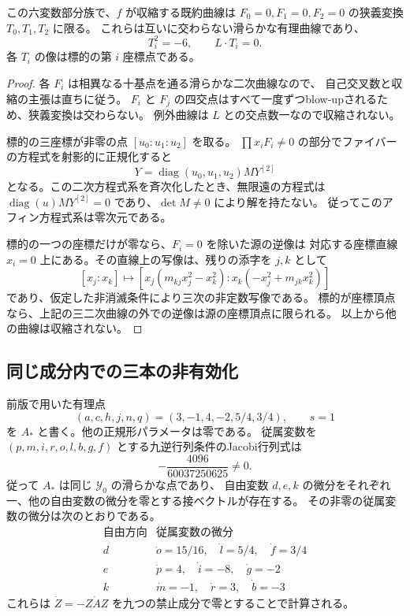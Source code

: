 \begin{lemma}[三本の $(-6)$ 曲線]
\label{lem:septic-three-conics-v30}
この六変数部分族で、$f$ が収縮する既約曲線は
$F_0=0,F_1=0,F_2=0$ の狭義変換 $T_0,T_1,T_2$ に限る。
これらは互いに交わらない滑らかな有理曲線であり、
\[
 T_i^2=-6,\qquad L\cdot T_i=0.
\]
各 $T_i$ の像は標的の第 $i$ 座標点である。
\end{lemma}
\begin{proof}
各 $F_i$ は相異なる十基点を通る滑らかな二次曲線なので、
自己交叉数と収縮の主張は直ちに従う。
$F_i$ と $F_j$ の四交点はすべて一度ずつblow-upされるため、狭義変換は交わらない。
例外曲線は $L$ との交点数一なので収縮されない。

標的の三座標が非零の点 $[u_0:u_1:u_2]$ を取る。
$\prod x_iF_i\ne0$ の部分でファイバーの方程式を射影的に正規化すると
\[
 Y=\operatorname{diag}(u_0,u_1,u_2)M Y^{[2]}
\]
となる。この二次方程式系を斉次化したとき、無限遠の方程式は
$\operatorname{diag}(u)M Y^{[2]}=0$ であり、$\det M\ne0$ により解を持たない。
従ってこのアフィン方程式系は零次元である。

標的の一つの座標だけが零なら、$F_i=0$ を除いた源の逆像は
対応する座標直線 $x_i=0$ 上にある。その直線上の写像は、残りの添字を $j,k$ として
\[
 [x_j:x_k]\longmapsto
 [x_j(m_{kj}x_j^2-x_k^2):x_k(-x_j^2+m_{jk}x_k^2)]
\]
であり、仮定した非消滅条件により三次の非定数写像である。
標的が座標頂点なら、上記の三二次曲線の外での逆像は源の座標頂点に限られる。
以上から他の曲線は収縮されない。
\end{proof}

\subsection{同じ成分内での三本の非有効化}

前版で用いた有理点
\[
 (a,c,h,j,n,q)=(3,-1,4,-2,5/4,3/4),\qquad s=1
\]
を $A_*$ と書く。他の正規形パラメータは零である。
従属変数を $(p,m,i,r,o,l,b,g,f)$ とする九逆行列条件のJacobi行列式は
\[
 -\frac{4096}{60037250625}\ne0.
\]
従って $A_*$ は同じ $\mathcal Y_0$ の滑らかな点であり、
自由変数 $d,e,k$ の微分をそれぞれ一、他の自由変数の微分を零とする接ベクトルが存在する。
その非零の従属変数の微分は次のとおりである。
\[
\begin{array}{c|l}
 \text{自由方向}&\text{従属変数の微分}\\\hline
 d&\dot o=15/16,\quad\dot l=5/4,\quad\dot f=3/4\\
 e&\dot p=4,\quad\dot i=-8,\quad\dot g=-2\\
 k&\dot m=-1,\quad\dot r=3,\quad\dot b=-3
\end{array}
\]
これらは $\dot Z=-Z\dot A Z$ を九つの禁止成分で零とすることで計算される。

